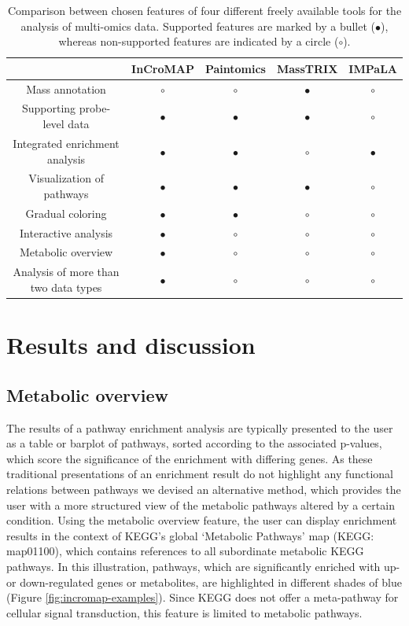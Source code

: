 \documentclass[final,5p,times,twocolumn]{elsarticle}
\newcommand\red[1]{{\color{red}#1}}
\begin{document}
\begin{table}
\center
\caption{Comparison between chosen features of four different freely available tools for the analysis of multi-omics data. Supported features are marked by a bullet ($\bullet$), whereas non-supported features are indicated by a circle ($\circ$).}
\begin{tabular}{ccccc}
\hline
 & InCroMAP & Paintomics & MassTRIX & IMPaLA\\
\hline
Mass annotation & $\circ$ & $\circ$ & $\bullet$ & $\circ$ \\
Supporting probe-level data & $\bullet$  & $\bullet$  & $\bullet$  & $\circ$ \\
Integrated enrichment analysis & $\bullet$  & $\bullet$ & $\circ$  & $\bullet$  \\
Visualization of pathways & $\bullet$ & $\bullet$ & $\bullet$  & $\circ$\\
Gradual coloring & $\bullet$  & $\bullet$ & $\circ$ & $\circ$\\
Interactive analysis & $\bullet$  & $\circ$ & $\circ$ & $\circ$\\
Metabolic overview  & $\bullet$  & $\circ$ & $\circ$ & $\circ$\\
Analysis of more than two data types & $\bullet$  & $\circ$ & $\circ$ & $\circ$ \\
\hline
\end{tabular}
\label{tab:incromap-comparison}
\end{table}

\section{\red{Results and discussion}}

\subsection{Metabolic overview}
The results of a pathway enrichment analysis are typically presented to the user as a table or barplot of pathways, sorted according to the associated p-values, which score the significance of the enrichment with differing genes. As these traditional presentations of an enrichment result do not highlight any functional relations between pathways we devised an alternative method, which provides the user with a more structured view of the metabolic pathways altered by a certain condition. Using the metabolic overview feature, the user can display enrichment results in the context of KEGG's global `Metabolic Pathways' map (KEGG: map01100), which contains references to all subordinate metabolic KEGG pathways. In this illustration, pathways, which are significantly enriched with up- or down-regulated genes or metabolites, are highlighted in different shades of blue (Figure \ref{fig:incromap-examples}). Since KEGG does not offer a meta-pathway for cellular signal transduction, this feature is limited to metabolic 
pathways. 
\end{document}
